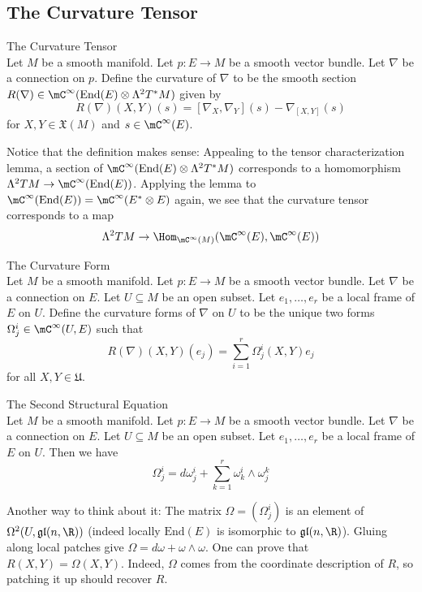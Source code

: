 \documentclass[a4paper]{article}
\begin{document}
\subsection{The Curvature Tensor}
\begin{defn}{The Curvature Tensor}{}\\
Let $M$ be a smooth manifold. Let $p:E\to M$ be a smooth vector bundle. Let $\nabla$ be a connection on $p$. Define the curvature of $\nabla$ to be the smooth section $R(\nabla)\in\mC^\infty(\text{End}(E)\otimes\Lambda^2T^\ast M)$ given by $$R(\nabla)(X,Y)(s)=[\nabla_X,\nabla_Y](s)-\nabla_{[X,Y]}(s)$$ for $X,Y\in\mathfrak{X}(M)$ and $s\in\mC^\infty(E)$. 
\end{defn}

Notice that the definition makes sense: Appealing to the tensor characterization lemma, a section of $\mC^\infty(\text{End}(E)\otimes\Lambda^2T^\ast M)$ corresponds to a homomorphism $\Lambda^2TM\to\mC^\infty(\text{End}(E))$. Applying the lemma to $\mC^\infty(\text{End}(E))=\mC^\infty(E^\ast\otimes E)$ again, we see that the curvature tensor corresponds to a map $$\Lambda^2TM\to\Hom_{\mC^\infty(M)}(\mC^\infty(E),\mC^\infty(E))$$

\begin{defn}{The Curvature Form}{}\\
Let $M$ be a smooth manifold. Let $p:E\to M$ be a smooth vector bundle. Let $\nabla$ be a connection on $E$. Let $U\subseteq M$ be an open subset. Let $e_1,\dots,e_r$ be a local frame of $E$ on $U$. Define the curvature forms of $\nabla$ on $U$ to be the unique two forms $\Omega_j^i\in\mC^\infty(U,E)$ such that $$R(\nabla)(X,Y)(e_j)=\sum_{i=1}^r\Omega_j^i(X,Y)e_j$$ for all $X,Y\in\mathfrak{U}$. 
\end{defn}

\begin{thm}{The Second Structural Equation}{}\\
Let $M$ be a smooth manifold. Let $p:E\to M$ be a smooth vector bundle. Let $\nabla$ be a connection on $E$. Let $U\subseteq M$ be an open subset. Let $e_1,\dots,e_r$ be a local frame of $E$ on $U$. Then we have $$\Omega_j^i=d\omega_j^i+\sum_{k=1}^r\omega_k^i\wedge\omega_j^k$$
\end{thm}

Another way to think about it: The matrix $\Omega=(\Omega_j^i)$ is an element of $\Omega^2(U,\mathfrak{gl}(n,\R))$ (indeed locally $\text{End}(E)$ is isomorphic to $\mathfrak{gl}(n,\R)$). Gluing along local patches give $\Omega=d\omega+\omega\wedge\omega$. One can prove that $R(X,Y)=\Omega(X,Y)$. Indeed, $\Omega$ comes from the coordinate description of $R$, so patching it up should recover $R$. 
\end{document}
